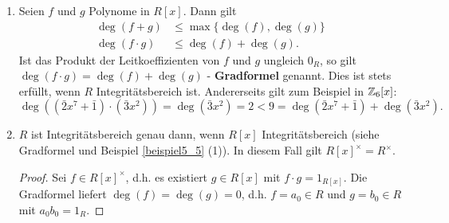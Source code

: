 \begin{rem}\label{rem5_9}
	\begin{enumerate}[label=(\roman*)]
		\item Seien $f$ und $g$ Polynome in $R[x]$. Dann gilt
		\begin{align*}
			\deg(f + g) &\leq \max\{\deg(f), \deg(g)\}\\
			\deg(f\cdot g) &\leq \deg(f) + \deg(g).
		\end{align*}
		Ist das Produkt der Leitkoeffizienten von $f$ und $g$ ungleich $0_R$, so gilt $\deg(f\cdot g) = \deg(f) + \deg(g)$ - \textbf{Gradformel} genannt.
		Dies ist stets erfüllt, wenn $R$ Integritätsbereich ist. Andererseits gilt zum Beispiel in $\mathbb{Z}_6 [x]$:
		\[\deg((\bar{2}x^7 + \bar{1})\cdot(\bar{3}x^2)) = \deg(\bar{3}x^2) = 2 < 9 = \deg(\bar{2}x^7 + \bar{1}) + \deg(\bar{3}x^2).\]
		\item $R$ ist Integritätsbereich genau dann, wenn $R[x]$ Integritätsbereich (siehe Gradformel und Beispiel \ref{beispiel5_5} (1)). In diesem Fall gilt $R[x]^\times = R^\times$.
		\begin{proof}
			Sei $f \in R[x]^\times$, d.h. es existiert $g \in R[x]$ mit $f \cdot g = 1_{R[x]}$. Die Gradformel liefert $\deg(f) = \deg(g) = 0$, d.h. $f = a_0 \in R$ und $g = b_0 \in R$ mit $a_0 b_0 = 1_R$.
		\end{proof} 
	\end{enumerate}
\end{rem}

